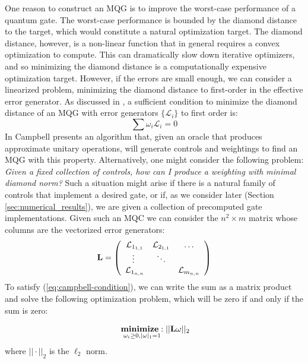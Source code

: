 \documentclass[aps,nofootinbib,pra,notitlepage,twocolumn]{revtex4-1}
\begin{document}
One reason to construct an MQG is to improve the worst-case performance of a quantum gate. The worst-case performance is bounded by the diamond distance to the target, which would constitute a natural optimization target.  The diamond distance, however, is a non-linear function that in general requires a convex optimization to compute\cite{watrous2018theory}. This can dramatically slow down iterative optimizers, and so minimizing the diamond distance is a computationally expensive optimization target. However, if the errors are small enough, we can consider a linearized problem, minimizing the diamond distance to first-order in the effective error generator. As discussed in \cite{Campbell2017}, a sufficient condition to minimize the diamond distance of an MQG with error generators $\{\mathcal{L}_i\}$ to first order is:
\begin{equation}\label{eq:campbell-condition}
\sum \omega_i \mathcal{L}_i = 0
\end{equation}
In \cite{Campbell2017} Campbell presents an algorithm that, given an oracle that produces approximate unitary operations, will generate controls and weightings to find an MQG with this property. Alternatively, one might consider the following problem: \textit{Given a fixed collection of controls, how can I produce a weighting with minimal diamond norm?} Such a situation might arise if there is a natural family of controls that implement a desired gate, or if, as we consider later (Section \ref{sec:numerical_results}), we are given a collection of precomputed gate implementations. Given such an MQC we can consider the $n^2\times m$ matrix whose columns are the vectorized error generators:
\begin{equation}\label{eq:vectorized_generators}
	\bold{L} = \left(\begin{array}{cccc}
		\mathcal{L}_{1_{1,1}} & \mathcal{L}_{2_{1,1}} & \ldots   \\ 
		\vdots\ & \ddots &    \\
		\mathcal{L}_{1_{n,n}} &  &  \mathcal{L}_{m_{n,n}} \\ 
	\end{array} 	
	\right)
\end{equation}
To satisfy (\ref{eq:campbell-condition}), we can write the sum as a matrix product and solve the following optimization problem, which will be zero if and only if the sum is zero:

\begin{equation}\label{eq:minimization}
  \begin{split}
    &\underset{\omega_i\geq0, |\omega|_1=1}{\textbf{minimize}: } ||\bold{L}\omega||_2\\
  \end{split}
\end{equation}
where $||\cdot||_2$ is the $\ell_2$ norm.
\end{document}

